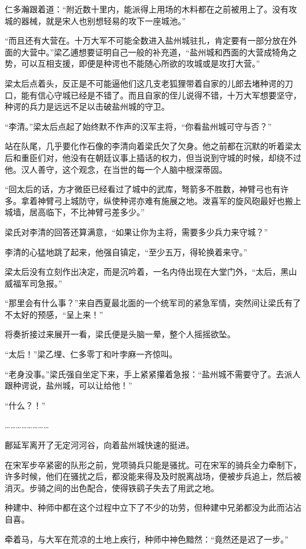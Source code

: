 仁多瀚跟着道：“附近数十里内，能派得上用场的木料都在之前被用上了。没有攻城的器械，就是宋人也别想轻易的攻下一座城池。”

“而且还有大营在。十万大军不可能全数进入盐州城驻扎，肯定要有一部分放在外面的大营中。”梁乙逋想要证明自己一般的补充道，“盐州城和西面的大营成犄角之势，可以互相支援，即便是种谔也不能随心所欲的攻城或是攻打大营。”

梁太后点着头，反正是不可能逼他们这几支老狐狸带着自家的儿郎去堵种谔的刀口，能有信心守城已经是不错了。而且自家的侄儿说得不错，十万大军想要坚守，种谔的兵力是远远不足以击破盐州城的守卫。

“李清。”梁太后点起了始终默不作声的汉军主将，“你看盐州城可守与否？”

站在队尾，几乎要化作石像的李清向着梁氏欠了欠身。他之前都在沉默的听着梁太后和重臣们对，他没有在朝廷议事上插话的权力，但当说到守城的时候，却绕不过他。汉人善守，这个观念，在当世的每一个人脑中根深蒂固。

“回太后的话，方才微臣已经看过了城中的武库，弩箭多不胜数，神臂弓也有许多。拿着神臂弓上城防守，纵使种谔亦难有施展之地。泼喜军的旋风砲最好也搬上城墙，居高临下，不比神臂弓差多少。”

梁氏对李清的回答还算满意，“如果让你为主将，需要多少兵力来守城？”

李清的心猛地跳了起来，他强自镇定，“至少五万，得轮换着来守。”

梁太后没有立刻作出决定，而是沉吟着，一名内侍出现在大堂门外，“太后，黑山威福军司急报。”

“那里会有什么事？”来自西夏最北面的一个统军司的紧急军情，突然间让梁氏有了不太好的预感，“呈上来！”

将奏折接过来展开一看，梁氏便是头脑一晕，整个人摇摇欲坠。

“太后！”梁乙埋、仁多零丁和叶孛麻一齐惊叫。

“老身没事。”梁氏强自坐定下来，手上紧紧攥着急报：“盐州城不需要守了。去派人跟种谔说，盐州城，可以让给他！”

“什么？！”

……………………

鄜延军离开了无定河河谷，向着盐州城快速的挺进。

在宋军步卒紧密的队形之前，党项骑兵只能是骚扰。可在宋军的骑兵全力牵制下，许多时候，他们在骚扰之后，都没能来得及及时脱离战场，便被步兵追上，然后被消灭。步骑之间的出色配合，使得铁鹞子失去了用武之地。

种建中、种师中都在这个过程中立下了不少的功劳，但种建中兄弟都没为此而沾沾自喜。

牵着马，与大军在荒凉的土地上疾行，种师中神色黯然：“竟然还是迟了一步。”

